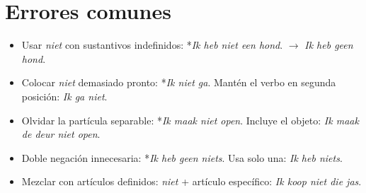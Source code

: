 \section{Errores comunes}
\begin{itemize}[leftmargin=*]
\item Usar \textit{niet} con sustantivos indefinidos: *\textit{Ik heb niet een hond}. $\rightarrow$ \textit{Ik heb geen hond}.
  \item Colocar \textit{niet} demasiado pronto: *\textit{Ik niet ga}. Mantén el verbo en segunda posición: \textit{Ik ga niet}.
  \item Olvidar la partícula separable: *\textit{Ik maak niet open}. Incluye el objeto: \textit{Ik maak de deur niet open}.
  \item Doble negación innecesaria: *\textit{Ik heb geen niets}. Usa solo una: \textit{Ik heb niets}.
  \item Mezclar con artículos definidos: \textit{niet} + artículo específico: \textit{Ik koop niet die jas}.
\end{itemize}
